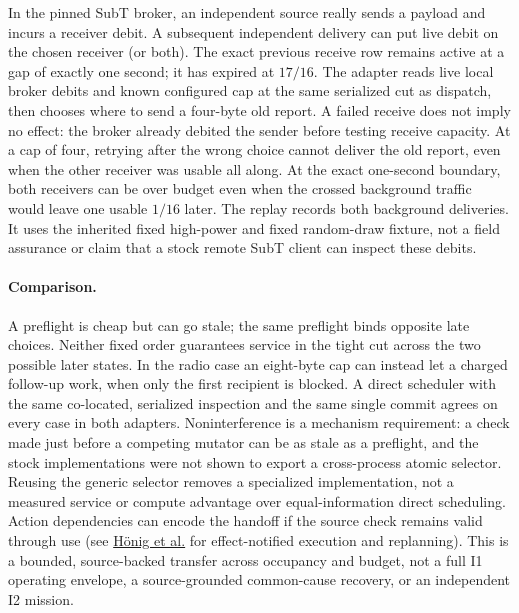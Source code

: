 \documentclass{article}
\begin{document}
In the pinned SubT broker, an independent source really sends a
payload and incurs a receiver debit. A subsequent independent
delivery can put live debit on the chosen receiver (or both). The
exact previous receive row remains active at a gap of exactly
one second; it has expired at $17/16$. The adapter reads live
local broker debits and known configured cap at the same serialized
cut as dispatch, then chooses where to send a four-byte old report.
A failed receive does not imply no effect: the broker already debited
the sender before testing receive capacity. At a cap of four, retrying
after the wrong choice cannot deliver the old report, even when the
other receiver was usable all along. At the exact one-second boundary,
both receivers can be over budget even when the crossed background
traffic would leave one usable $1/16$ later. The replay records both
background deliveries. It uses the inherited fixed high-power and
fixed random-draw fixture, not a field assurance or claim that a
stock remote SubT client can inspect these debits.

\paragraph{Comparison.}
A preflight is cheap but can go stale; the same preflight binds opposite
late choices. Neither fixed order guarantees service in the tight
cut across the two possible later states. In the radio case an eight-byte
cap can instead let a charged follow-up work, when only the first
recipient is blocked. A direct scheduler with the same co-located,
serialized inspection and the same single commit agrees on every
case in both adapters. Noninterference is a mechanism requirement:
a check made just before a competing mutator can be as stale as a
preflight, and the stock implementations were not shown to export a
cross-process atomic selector. Reusing the generic selector removes a
specialized implementation, not a measured service or compute
advantage over equal-information direct scheduling. Action dependencies
can encode the handoff if the source check remains valid through use
(see \href{https://whoenig.github.io/publications/2019_RA-L_Hoenig.pdf}{H\"onig et al.}
for effect-notified execution and replanning). This is a bounded,
source-backed transfer across occupancy and budget, not a full I1
operating envelope, a source-grounded common-cause recovery, or an
independent I2 mission.
\end{document}
